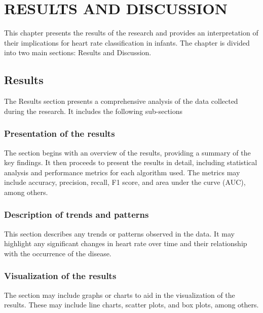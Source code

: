 \section{RESULTS AND DISCUSSION}\label{cap:resultsANDdiscussion}

This chapter presents the results of the research and provides an interpretation of their implications for heart rate classification in infants. The chapter is divided into two main sections: Results and Discussion.

\lipsum[100]

\subsection{Results}\label{sec:results}

The Results section presents a comprehensive analysis of the data collected during the research. It includes the following sub-sections

\subsubsection{Presentation of the results}\label{sec:presentationoftheresults}

The section begins with an overview of the results, providing a summary of the key findings. It then proceeds to present the results in detail, including statistical analysis and performance metrics for each algorithm used. The metrics may include accuracy, precision, recall, F1 score, and area under the curve (AUC), among others.

\subsubsection{Description of trends and patterns}\label{sec:descriptionoftrendsandpatterns}

This section describes any trends or patterns observed in the data. It may highlight any significant changes in heart rate over time and their relationship with the occurrence of the disease.

\subsubsection{Visualization of the results}\label{sec:visualizationoftheresults}

The section may include graphs or charts to aid in the visualization of the results. These may include line charts, scatter plots, and box plots, among others.

